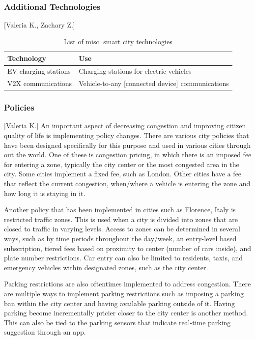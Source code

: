 \documentclass[12pt]{article}                       %
\begin{document}
\subsubsection{Additional Technologies}[Valeria K., Zachary Z.]
\begin{table}[H]
    \centering
    \small
    \begin{tabular}{l|l}
        \textbf{Technology} & \textbf{Use} \\
        \hline{}
        
        EV charging stations &
        Charging stations for electric vehicles \\
        \hline{}
        
        V2X communications &
        Vehicle-to-any [connected device] communications
    \end{tabular}
    \caption{List of misc. smart city technologies}
    \label{tab:additional_tech}
\end{table}

\subsubsection{Policies}[Valeria K.] \label{sec:policies}
An important aspect of decreasing congestion and improving citizen quality of life is implementing policy changes. There are various city policies that have been designed specifically for this purpose and used in various cities through out the world. One of these is congestion pricing, in which there is an imposed fee for entering a zone, typically the city center or the most congested area in the city. Some cities implement a fixed fee, such as London. Other cities have a fee that reflect the current congestion, when/where a vehicle is entering the zone and how long it is staying in it.

Another policy that has been implemented in cities such as Florence, Italy is restricted traffic zones. This is used when a city is divided into zones that are closed to traffic in varying levels. Access to zones can be determined in several ways, such as by time periods throughout the day/week, an entry-level based subscription, tiered fees based on proximity to center (number of cars inside), and plate number restrictions. Car entry can also be limited to residents, taxis, and emergency vehicles within designated zones, such as the city center. 

Parking restrictions are also oftentimes implemented to address congestion. There are multiple ways to implement parking restrictions such as imposing a parking ban within the city center and having available parking outside of it. Having parking become incrementally pricier closer to the city center is another method. This can also be tied to the parking sensors that indicate real-time parking suggestion through an app.
\end{document}
